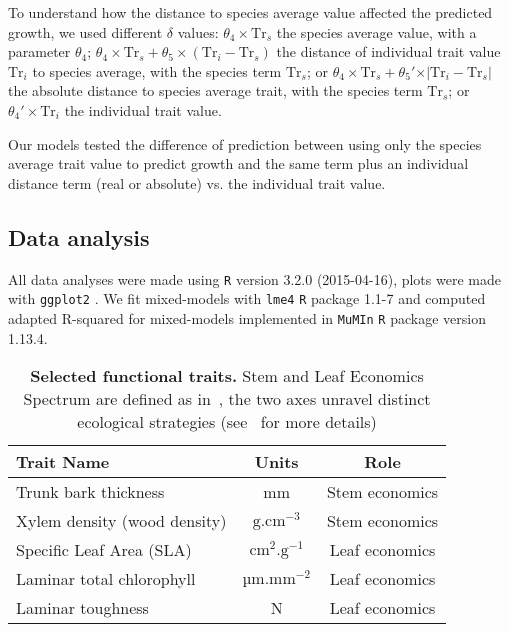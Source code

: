 To understand how the distance to species average value affected the predicted growth, we used different $\delta$ values: $\theta_4 \times \text{Tr}_s$ the species average value, with a parameter $\theta_4$; $\theta_4 \times \text{Tr}_s + \theta_5 \times(\text{Tr}_i - \text{Tr}_s)$ the distance of individual trait value $\text{Tr}_i$ to species average, with the species term $\text{Tr}_s$; or $\theta_4 \times \text{Tr}_s + \theta_5' \times \vert \text{Tr}_i - \text{Tr}_s \vert$ the absolute distance to species average trait, with the species term $\text{Tr}_s$; or $\theta_4' \times \text{Tr}_i$ the individual trait value.

Our models tested the difference of prediction between using only the species average trait value to predict growth and the same term plus an individual distance term (real or absolute) vs. the individual trait value.

\subsection*{Data analysis}

All data analyses were made using \texttt{R} \citep{R_language} version 3.2.0 (2015-04-16), plots were made with \texttt{ggplot2} \citep{ggplot2_pkg}. We fit mixed-models with \texttt{lme4} \texttt{R} package \citep{lme4_pkg} 1.1-7 and computed adapted R-squared for mixed-models \citep{nakagawa_general_2013} implemented in \texttt{MuMIn} \texttt{R} package \citep{mumin_pkg} version 1.13.4.

\begin{table}
	\begin{center}
		\begin{tabular}{lcc}
		\hline \hline
		Trait Name & Units & Role \\
		\hline
		Trunk bark thickness & mm & Stem economics \\
		Xylem density (wood density) & $\text{g}.\text{cm}^{-3}$ & Stem economics \\
		Specific Leaf Area (SLA) & $\text{cm}^2.\text{g}^{-1}$ & Leaf economics \\
		Laminar total chlorophyll & $\text{µm}.\text{mm}^{-2}$  & Leaf economics \\
		Laminar toughness & N & Leaf economics \\
		\hline \hline
		\end{tabular}
		\caption{\textbf{Selected functional traits.} Stem and Leaf Economics Spectrum are defined as in~\citep{baraloto_decoupled_2010}, the two axes unravel distinct ecological strategies (see~ for more details)} 
		\label{tab:seltraits}
	\end{center}
\end{table}
